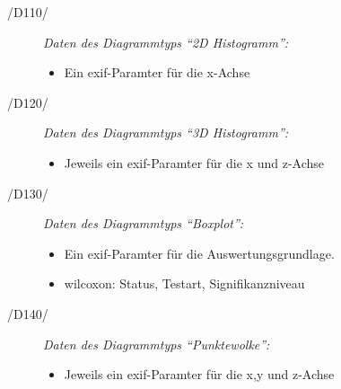 \begin{description}

	\item[/D110/] \textit{Daten des Diagrammtyps "`2D Histogramm"':}
	\begin{itemize}
		\item Ein \gls{exif}-Paramter für die x-Achse
	\end{itemize}
				
	\item[/D120/] \textit{Daten des Diagrammtyps "`3D Histogramm"':}
		\begin{itemize}
		\item Jeweils ein \gls{exif}-Paramter für die x und z-Achse
	\end{itemize}
	
	\item[/D130/] \textit{Daten des Diagrammtyps "`Boxplot"':}
		\begin{itemize}
		\item Ein \gls{exif}-Paramter für die Auswertungsgrundlage.
		\item \gls{wilcoxon}: Status, Testart, Signifikanzniveau
	\end{itemize}
	
	\item[/D140/] \textit{Daten des Diagrammtyps "`Punktewolke"':}
		\begin{itemize}
		\item Jeweils ein \gls{exif}-Paramter für die x,y und z-Achse
	\end{itemize}

\end{description}